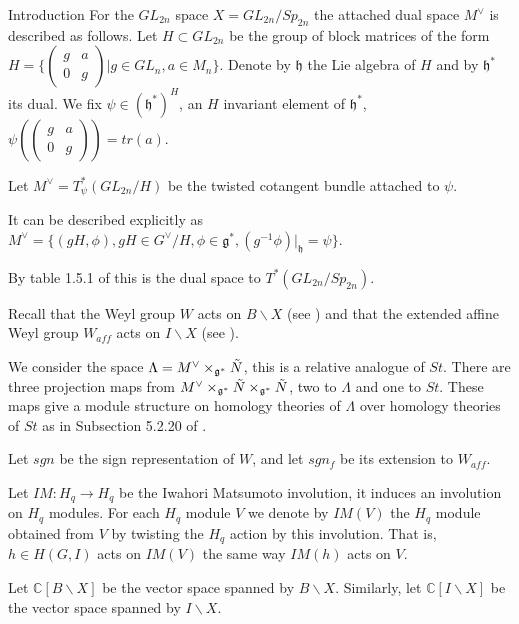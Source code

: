 \documentclass[12pt]{article}
\newcommand{\C}{\mathbb{C}}
\newcommand{\<}{\langle}
\renewcommand{\>}{\rangle}
\theoremstyle{plain}
\theoremstyle{definition}
\begin{document}
\begin{section}{Introduction}
For the $GL_{2n}$ space $X=GL_{2n}/Sp_{2n}$ the attached dual space $M^\vee$ is described as follows.
Let $H\subset GL_{2n}$ be the group of block matrices of the form $H=\{\begin{pmatrix}
        g & a  \\
        0 & g
        \end{pmatrix}|g\in GL_n,a\in M_n\}$. Denote by $\mathfrak{h}$ the Lie algebra of $H$ and by $\mathfrak{h}^*$ its dual. We fix $\psi\in (\mathfrak{h}^*)^H$, an $H$ invariant element of $\mathfrak{h}^*$, $\psi(\begin{pmatrix}
        g & a  \\
        0 & g
        \end{pmatrix})=tr(a)$. 

        Let $M^\vee=T_\psi^*(GL_{2n}/H)$ be the twisted cotangent bundle attached to $\psi$.

        It can be described explicitly as $M^\vee=\{(gH,\phi),gH\in G^\vee/H, \phi\in \mathfrak{g}^*, (g^{-1}\phi)|_\mathfrak{h}=\psi\}$.
         
         By table 1.5.1 of \cite{benzvi2024relativelanglandsduality} this is the dual space to $T^*(GL_{2n}/Sp_{2n})$. 

       Recall that the Weyl group $W$ acts on $B\backslash X$ (see \cite{knop}) and that the extended affine Weyl group $W_{aff}$ acts on $I\backslash X$ (see \cite{my}).

        We consider the space $\Lambda=M^\vee\times_{\mathfrak{g}^*}\Tilde{N}$, this is a relative analogue of $St$. There are three projection maps from $M^\vee\times_{\mathfrak{g}^*}\Tilde{N}\times_{\mathfrak{g}^*}\Tilde{N}$, two to $\Lambda$ and one to $St$. These maps give a module structure on homology theories of $\Lambda$ over homology theories of $St$ as in Subsection 5.2.20 of \cite{Chriss1997RepresentationTA}.

        Let $sgn$ be the sign representation of $W$, and let $sgn_f$ be its extension to $W_{aff}$.
        
        Let $IM:H_q\rightarrow H_q$ be the Iwahori Matsumoto involution, it induces an involution on $H_q$ modules. For each $H_q$ module $V$ we denote by $IM(V)$ the $H_q$ module obtained from $V$ by twisting the $H_q$ action by this involution. That is, $h\in H(G,I)$ acts on $IM(V)$ the same way $IM(h)$ acts on $V$. 

        Let $\C[B\backslash X]$ be the vector space spanned by $B\backslash X$. Similarly, let $\C[I\backslash X]$ be the vector space spanned by $I\backslash X$. 


\end{section}
\end{document}
